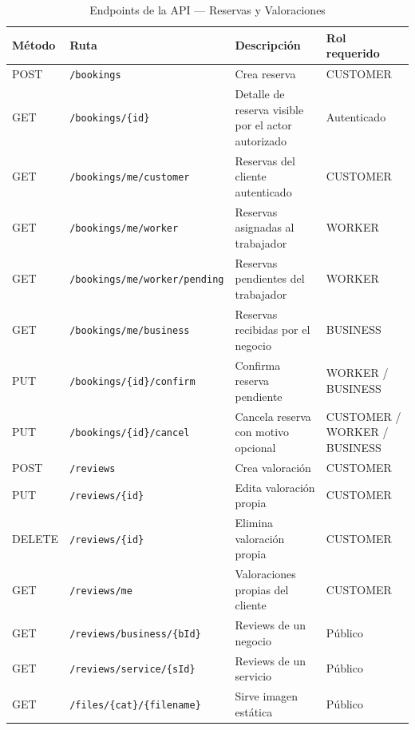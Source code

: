 \documentclass[12pt,a4paper,twoside]{report}
\begin{document}
\begin{table}[htbp]
\centering
\scriptsize
\caption{Endpoints de la API — Reservas y Valoraciones}
\label{tab:endpoints-bookings}
\begin{tabularx}{\textwidth}{@{}L{0.10\textwidth}L{0.36\textwidth}Y L{0.18\textwidth}@{}}
\toprule
Método & Ruta & Descripción & Rol requerido \\
\midrule
POST & \texttt{/bookings} & Crea reserva & CUSTOMER \\
GET  & \texttt{/bookings/\{id\}} & Detalle de reserva visible por el actor autorizado & Autenticado \\
GET  & \texttt{/bookings/me/customer} & Reservas del cliente autenticado & CUSTOMER \\
GET  & \texttt{/bookings/me/worker} & Reservas asignadas al trabajador & WORKER \\
GET  & \texttt{/bookings/me/worker/pending} & Reservas pendientes del trabajador & WORKER \\
GET  & \texttt{/bookings/me/business} & Reservas recibidas por el negocio & BUSINESS \\
PUT  & \texttt{/bookings/\{id\}/confirm} & Confirma reserva pendiente & WORKER / BUSINESS \\
PUT  & \texttt{/bookings/\{id\}/cancel} & Cancela reserva con motivo opcional & CUSTOMER / WORKER / BUSINESS \\
POST & \texttt{/reviews} & Crea valoración & CUSTOMER \\
PUT  & \texttt{/reviews/\{id\}} & Edita valoración propia & CUSTOMER \\
DELETE & \texttt{/reviews/\{id\}} & Elimina valoración propia & CUSTOMER \\
GET  & \texttt{/reviews/me} & Valoraciones propias del cliente & CUSTOMER \\
GET  & \texttt{/reviews/business/\{bId\}} & Reviews de un negocio & Público \\
GET  & \texttt{/reviews/service/\{sId\}} & Reviews de un servicio & Público \\
GET  & \texttt{/files/\{cat\}/\{filename\}} & Sirve imagen estática & Público \\
\bottomrule
\end{tabularx}
\end{table}
\end{document}
